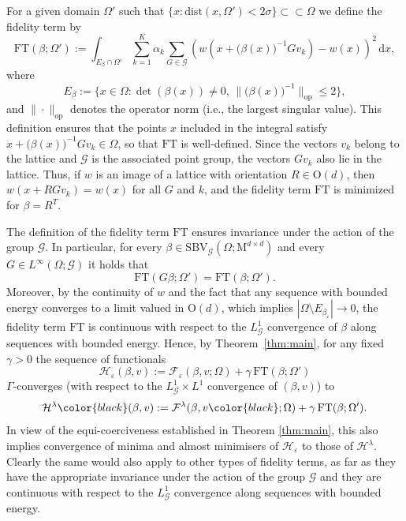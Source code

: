 \documentclass[a4paper,reqno]{amsart}
\newcommand{\SBVG}{\mathrm{SBV}_{\mathcal{G}}}
\newcommand\LG{{L}^1_\G}
\newcommand\dist{{\mathrm{dist}}}
\newcommand\eps{{\varepsilon}}
\theoremstyle{remark}
\newcommand{\EEE}{\color{black}}
\newcommand\dx{{\,\mathrm{d}x}}
\newcommand{\F}{\mathcal{F}}
\newcommand{\G}{\mathcal{G}}
\newcommand{\cH}{\mathcal{H}}
\newcommand{\FT}{\mathrm{FT}}
\newcommand{\On}{\mathrm{O}(d)}
\newcommand{\Mno}{\mathrm{M}^{d\times d}}
\numberwithin{equation}{section}
\begin{document}
For a given domain $\Omega'$ such that $\{x\colon \dist(x,\Omega') <2\sigma\}\subset\subset \Omega$
we define the fidelity term by
\begin{equation}\label{0212231710}
	\FT(\beta; \Omega'):= \int_{E_\beta \cap \Omega'} \sum_{k=1}^{K}\alpha_k\sum_{G\in\G} (w(x+ \big(\beta(x)\big)^{-1}Gv_k)- w(x))^2 \dx,
\end{equation}
where
\begin{equation*}
	E_\beta:=\{x \in \Omega \colon \det(\beta(x))\ne 0, \, \|\big(\beta(x)\big)^{-1}\|_\mathrm{op}\leq 2\},
\end{equation*}
and
$\|\cdot\|_\mathrm{op}$ denotes the operator norm (i.e., the largest singular value). This definition  ensures that the points $x$ included in the integral satisfy $x+\big(\beta(x)\big)^{-1}Gv_k\in \Omega$, so that $\FT$ is well-defined.
Since the vectors $v_k$ belong to the lattice and $\G$ is the associated point group, the vectors $Gv_k$ also lie in the lattice. Thus, if $w$ is an image of a lattice with orientation $R\in\On$, then $w(x+RGv_k)=w(x)$  for all $G$ and $k$, and the fidelity term $\FT$ is minimized for $\beta=R^T$.

The definition of the fidelity term $\FT$ ensures invariance under the action of the group $\G$. In particular,
 for every $\beta\in \SBVG(\Omega; \Mno)$ and every $G\in L^\infty(\Omega;\G)$ it holds that
\begin{equation}\label{eq-fidelity-invariance}
	\FT(G\beta;\Omega')=\FT(\beta;\Omega').
\end{equation}
Moreover, by the continuity of $w$
and the fact that any sequence with bounded energy converges to a limit valued in $\On$, which implies $|\Omega\setminus E_{\beta_\eps}|\to0$,
the fidelity term $\FT$
 is continuous
with respect to the $\LG$ convergence of $\beta$ along sequences with bounded energy. 
Hence, by Theorem~\ref{thm:main},
for any fixed $\gamma>0$ the sequence of functionals
\begin{equation}\label{2611231320}	\cH_\varepsilon(\beta,v):=\F_\varepsilon(\beta,v;\Omega) + \gamma \, \FT(\beta; \Omega')
\end{equation}
$\Gamma$-converges
(with respect to the $\LG\times L^1$ convergence of  $(\beta,v)$)
to
\begin{equation}\label{2611231320l}
\cH^\lambda \EEE(\beta,v):=\F^\lambda(\beta, v \EEE;\Omega) + \gamma \, \FT(\beta; \Omega').
\end{equation}
In view of the equi-coerciveness established in Theorem \ref{thm:main}, this also implies convergence of minima and almost minimisers of $\cH_\varepsilon$ to those of $\cH^\lambda$.
Clearly the same would also apply to other types of fidelity terms,  as far as they have the appropriate invariance under the action of the group $\G$ and they are continuous with respect to the $\LG$ convergence along sequences with bounded energy.
\end{document}
